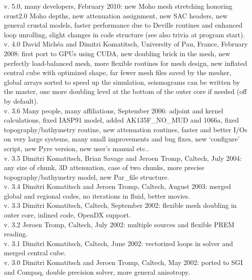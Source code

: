 \documentclass[oneside,english]{book}
\begin{document}
 v. 5.0, many developers, February 2010:
     new Moho mesh stretching honoring crust2.0 Moho depths,
     new attenuation assignment, new SAC headers, new general crustal models,
     faster performance due to Deville routines and enhanced loop unrolling,
     slight changes in code structure (see also trivia at program start).\\

 v. 4.0 David Mich\'ea and Dimitri Komatitsch, University of Pau, France, February 2008:
      first port to GPUs using CUDA, new doubling brick in the mesh, new perfectly load-balanced mesh,
      more flexible routines for mesh design, new inflated central cube
      with optimized shape, far fewer mesh files saved by the mesher,
      global arrays sorted to speed up the simulation, seismograms can be
      written by the master, one more doubling level at the bottom
      of the outer core if needed (off by default).\\

 v. 3.6 Many people, many affiliations, September 2006:
      adjoint and kernel calculations, fixed IASP91 model,
      added AK135F\_NO\_MUD and 1066a, fixed topography/bathymetry routine,
      new attenuation routines, faster and better I/Os on very large
      systems, many small improvements and bug fixes, new `configure'
      script, new Pyre version, new user's manual etc..\\

 v. 3.5 Dimitri Komatitsch, Brian Savage and Jeroen Tromp, Caltech, July 2004:
      any size of chunk, 3D attenuation, case of two chunks,
      more precise topography/bathymetry model, new Par\_file structure.\\

 v. 3.4 Dimitri Komatitsch and Jeroen Tromp, Caltech, August 2003:
      merged global and regional codes, no iterations in fluid, better movies.\\

 v. 3.3 Dimitri Komatitsch, Caltech, September 2002:
      flexible mesh doubling in outer core, inlined code, OpenDX support.\\

 v. 3.2 Jeroen Tromp, Caltech, July 2002:
      multiple sources and flexible PREM reading.\\

 v. 3.1 Dimitri Komatitsch, Caltech, June 2002:
      vectorized loops in solver and merged central cube.\\

 v. 3.0 Dimitri Komatitsch and Jeroen Tromp, Caltech, May 2002:
   ported to SGI and Compaq, double precision solver, more general anisotropy.\\
\end{document}

